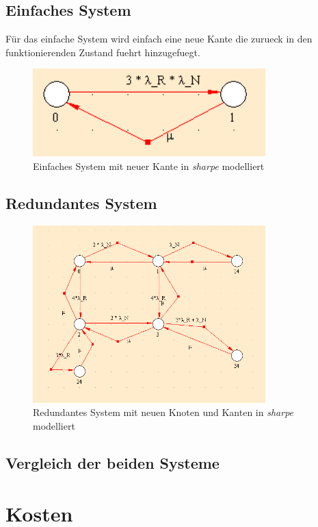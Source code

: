 \documentclass[10pt,a4paper]{article}
\begin{document}
\subsection{Einfaches System}
Für das einfache System wird einfach eine neue Kante die zurueck in den funktionierenden Zustand fuehrt hinzugefuegt.
\begin{figure}[ht!]
\centering
\includegraphics[width=90mm]{AVAILABILITY_Einfach.png}
\caption{Einfaches System mit neuer Kante in \textit{sharpe} modelliert \label{avail_einfach}}
\end{figure}

\subsection{Redundantes System}
\begin{figure}[ht!]
\centering
\includegraphics[width=90mm]{AVAILABILITY_RED.png}
\caption{Redundantes System mit neuen Knoten und Kanten in \textit{sharpe} modelliert \label{avail_einfach}}
\end{figure}

\subsection{Vergleich der beiden Systeme}
\section{Kosten}
\end{document}
